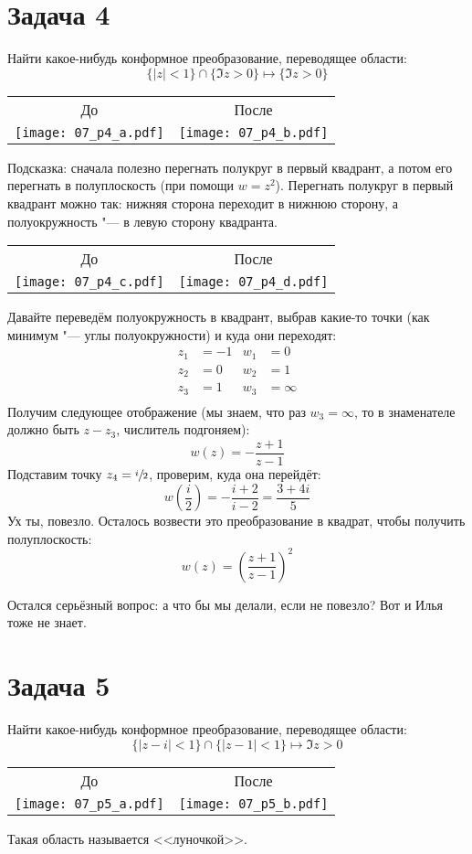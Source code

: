 \section{Задача 4}
	Найти какое-нибудь конформное преобразование, переводящее области:
	\[ \{ |z|<1 \} \cap \{\Im z > 0\} \mapsto \{ \Im z > 0 \} \]
	\begin{center}
		\begin{tabular}{cc}
		До & После \\
		\texttt{[image: 07\_p4\_a.pdf]} & \texttt{[image: 07\_p4\_b.pdf]} \\
		\end{tabular}
	\end{center}

	Подсказка: сначала полезно перегнать полукруг в первый квадрант, а потом его перегнать в полуплоскость
	(при помощи $w=z^2$).
	Перегнать полукруг в первый квадрант можно так: нижняя сторона переходит в нижнюю сторону,
	а полуокружность "--- в левую сторону квадранта.
	\begin{center}
		\begin{tabular}{cc}
		До & После \\
		\texttt{[image: 07\_p4\_c.pdf]} & \texttt{[image: 07\_p4\_d.pdf]} \\
		\end{tabular}
	\end{center}

	Давайте переведём полуокружность в квадрант, выбрав какие-то точки (как минимум "--- углы полуокружности)
	и куда они переходят:
	\begin{align*}
		z_1 &= -1 & w_1 &= 0 \\
		z_2 &= 0 & w_2 &= 1 \\
		z_3 &= 1 & w_3 &= \infty \\
	\end{align*}
	Получим следующее отображение (мы знаем, что раз $w_3=\infty$,
	то в знаменателе должно быть $z-z_3$, числитель подгоняем):
	\[ w(z)=-\frac{z+1}{z-1} \]
	Подставим точку $z_4=\sfrac i2$, проверим, куда она перейдёт:
	\[ w(\frac i2) = -\frac{i+2}{i-2} = \frac{3+4i}{5} \]
	Ух ты, повезло.
	Осталось возвести это преобразование в квадрат, чтобы получить полуплоскость:
	\[ w(z) = \left(\frac{z+1}{z-1}\right)^2 \]
	\begin{Rem}
		Остался серьёзный вопрос: а что бы мы делали, если не повезло?
		Вот и Илья тоже не знает.
	\end{Rem}

\section{Задача 5}
	Найти какое-нибудь конформное преобразование, переводящее области:
	\[ \{ |z-i|<1 \} \cap \{ |z-1| < 1 \} \mapsto \Im z > 0 \]
	\begin{center}
		\begin{tabular}{cc}
		До & После \\
		\texttt{[image: 07\_p5\_a.pdf]} & \texttt{[image: 07\_p5\_b.pdf]} \\
		\end{tabular}
	\end{center}
	Такая область называется <<луночкой>>.

